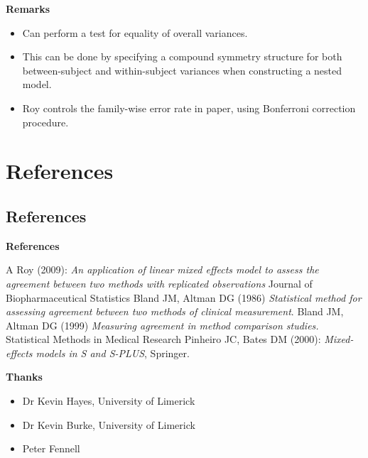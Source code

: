 \documentclass[compress]{beamer}        %
\makeatletter
\newcommand{\tcb}{\textcolor{beamer@blendedblue}}
\makeatother
\begin{document}
		\begin{frame}[fragile]{\bf \tcb{Remarks}}
			\large 
			\begin{itemize}
				\item Can perform a test for equality of overall variances.\\
				\vspace{0.25cm}\item This can be done by specifying a compound symmetry structure for both between-subject and within-subject variances when constructing a nested model.\\
				\vspace{0.25cm}\item Roy controls the family-wise error rate in paper, using Bonferroni correction procedure.
			\end{itemize}
		\end{frame}
		\section[References]{References}
		\subsection{References}
		\begin{frame}{\bf \tcb{References}}
			\begin{thebibliography}{99}
				 A Roy (2009): \emph{An application of linear mixed effects model to assess the agreement between two methods with replicated observations} Journal of Biopharmaceutical Statistics
				 Bland JM, Altman DG (1986) \emph{Statistical method for assessing agreement between two methods of clinical measurement}.
				 Bland JM, Altman DG (1999)  \emph{Measuring agreement in method comparison studies.} Statistical Methods in Medical Research
				 Pinheiro JC, Bates DM (2000): \emph{Mixed-effects models in S and S-PLUS},
				Springer.
			\end{thebibliography}
		\end{frame}
		
		
		\begin{frame}{\bf \tcb{Thanks}}
			\begin{itemize}
				\item Dr Kevin Hayes, University of Limerick
				\item Dr Kevin Burke, University of Limerick
				\item Peter Fennell
			\end{itemize}
		\end{frame}
		
		
\end{document}
